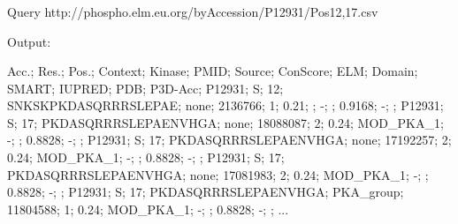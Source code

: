 \documentclass[a4paper,10pt,xcolor=pdftex,dvipsnames,table]{beamer}
\begin{document}
\begin{frame}[t,fragile]\frametitle{\insertsection{}}
    \note{~}
    \begin{alertblock}{Query}%
        http://phospho.elm.eu.org/\alert<2>{byAccession}/\alert<3>{P12931}/\alert<4>{Pos12,17}.\alert<5>{csv}%
    \end{alertblock}%
    Output:\\
    \hspace*{-1cm}
    \begin{semiverbatim}
    \scriptsize{
    \hspace*{-0.75cm}Acc.; Res.; Pos.; Context; Kinase; PMID; Source; ConScore; ELM; Domain; SMART; IUPRED; PDB; P3D-Acc;
    \hspace*{-0.75cm}\alert<3>{P12931}; S; \alert<4>{12}; SNKSKPKDASQRRRSLEPAE; none; 2136766; 1; 0.21; ; -; ; 0.9168; -; ;
    \hspace*{-0.75cm}\alert<3>{P12931}; S; \alert<4>{17}; PKDASQRRRSLEPAENVHGA; none; 18088087; 2; 0.24; MOD_PKA_1; -; ; 0.8828; -; ;
    \hspace*{-0.75cm}\alert<3>{P12931}; S; \alert<4>{17}; PKDASQRRRSLEPAENVHGA; none; 17192257; 2; 0.24; MOD_PKA_1; -; ; 0.8828; -; ;
    \hspace*{-0.75cm}\alert<3>{P12931}; S; \alert<4>{17}; PKDASQRRRSLEPAENVHGA; none; 17081983; 2; 0.24; MOD_PKA_1; -; ; 0.8828; -; ;
    \hspace*{-0.75cm}\alert<3>{P12931}; S; \alert<4>{17}; PKDASQRRRSLEPAENVHGA; PKA_group; 11804588; 1; 0.24; MOD_PKA_1; -; ; 0.8828; -; ;
    \hspace*{-0.75cm}...
    }
    \end{semiverbatim}%
\end{frame}
\end{document}
